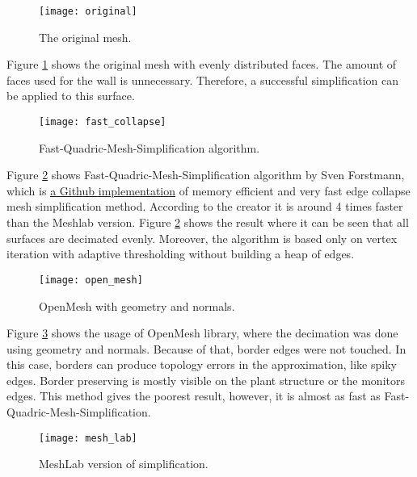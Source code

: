 \begin{figure}[H]
  \begin{center}
    \texttt{[image: original]}
    \caption{The original mesh.}
    \label{fig:original}
  \end{center}
\end{figure}

Figure \ref{fig:original} shows the original mesh with evenly distributed faces. The amount of faces used for the wall is unnecessary. Therefore, a successful simplification can be applied to this surface.

\begin{figure}[H]
  \begin{center}
    \texttt{[image: fast\_collapse]}
    \caption{Fast-Quadric-Mesh-Simplification algorithm.}
    \label{fig:fast_collapse}
  \end{center}
\end{figure}

Figure \ref{fig:fast_collapse} shows Fast-Quadric-Mesh-Simplification algorithm by Sven Forstmann, which is \href{https://github.com/sp4cerat/Fast-Quadric-Mesh-Simplification}{a Github implementation} of memory efficient and very fast edge collapse mesh simplification method. According to the creator it is around 4 times faster than the Meshlab version. Figure \ref{fig:fast_collapse} shows the result where it can be seen that all surfaces are decimated evenly. Moreover, the algorithm is based only on vertex iteration with adaptive thresholding without building a heap of edges.

\begin{figure}[H]
  \begin{center}
    \texttt{[image: open\_mesh]}
    \caption{OpenMesh with geometry and normals.}
    \label{fig:open_mesh}
  \end{center}
\end{figure}

Figure \ref{fig:open_mesh} shows the usage of OpenMesh library, where the decimation was done using geometry and normals. Because of that, border edges were not touched. In this case, borders can produce topology errors in the approximation, like spiky edges. Border preserving is mostly visible on the plant structure or the monitors edges. This method gives the poorest result, however, it is almost as fast as Fast-Quadric-Mesh-Simplification.

\begin{figure}[H]
  \begin{center}
    \texttt{[image: mesh\_lab]}
    \caption{MeshLab version of simplification.}
    \label{fig:mesh_lab}
  \end{center}
\end{figure}

